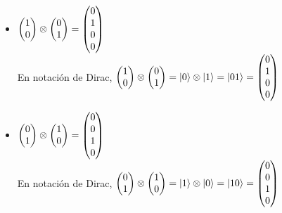 \documentclass[osajnl,preprint,showpacs,superscriptaddress,10pt]{revtex4-1} %
\DeclarePairedDelimiter\ket{\lvert}{\rangle}
\begin{document}
\begin{itemize}
    \item $\begin{pmatrix}1 \\ 0\end{pmatrix} \tens \begin{pmatrix}0 \\ 1\end{pmatrix} = \begin{pmatrix}0 \\ 1 \\ 0 \\ 0\end{pmatrix}$ \\
    
    En notación de Dirac, $\begin{pmatrix}1 \\ 0\end{pmatrix} \tens \begin{pmatrix}0 \\ 1\end{pmatrix} = \ket{0} \tens \ket{1} = \ket{01} = \begin{pmatrix}0 \\ 1 \\ 0 \\ 0\end{pmatrix}$
    
    \item $\begin{pmatrix}0 \\ 1\end{pmatrix} \tens \begin{pmatrix}1 \\ 0\end{pmatrix} = \begin{pmatrix}0 \\ 0 \\ 1 \\ 0\end{pmatrix}$ \\
    
    En notación de Dirac, $\begin{pmatrix}0 \\ 1\end{pmatrix} \tens \begin{pmatrix}1 \\ 0\end{pmatrix} = \ket{1} \tens \ket{0} = \ket{10} = \begin{pmatrix}0 \\ 0 \\ 1 \\ 0\end{pmatrix}$
    

\end{itemize}
\end{document}
